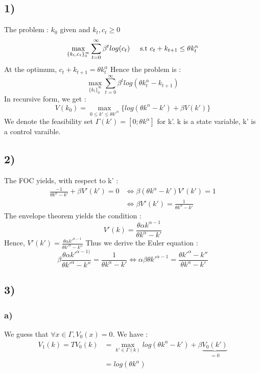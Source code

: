 \documentclass{article}
\begin{document}
\subsection{1)}
The problem : $k_0$ given and $k_t,c_t \geq 0$
$$\max_{\{k_t,c_t\}_0^\infty}\sum_{t=0}^\infty\beta^t log(c_t) \hspace{0.5cm}\text{s.t } c_t+k_{t+1}\leq \theta k_t^\alpha$$
At the optimum, $c_t + k_{t+1}=\theta k_t^\alpha$
Hence the problem is : 
$$\max_{\{k_t\}_0^\infty}\sum_{t=0}^\infty\beta^tlog(\theta k_t^\alpha - k_{t+1})$$
In recursive form, we get : $$V(k_0) = \max_{0\leq k' \leq \theta k'^\alpha }\{log(\theta k ^\alpha - k') + \beta V(k')\}$$
We denote the feasibility set $\Gamma(k') = [0; \theta k^\alpha]$ for k'. k is a state variable, k' is a control varaible. 

\subsection{2)}
The FOC yields, with respect to k' : $$\begin{aligned}\frac{-1}{\theta k^\alpha-k'} + \beta V'(k') = 0 &\Longleftrightarrow \beta (\theta k^\alpha-k')V'(k') = 1\\
&\Longleftrightarrow \beta V'(k') = \frac{1}{\theta k^\alpha-k'}\end{aligned}$$
The envelope theorem yields the condition : 
$$V'(k) = \frac{\theta \alpha k^{\alpha-1}}{\theta k^\alpha-k'}$$
Hence, $V'(k') = \frac{\theta \alpha k'^{\alpha-1}}{\theta k'^\alpha-k''}$
Thus we derive the Euler equation : 
$$\beta \frac{\theta\alpha k'^{\alpha-1)}}{\theta k'^\alpha-k''}=\frac{1}{\theta k^\alpha - k'}\Longleftrightarrow \alpha\beta\theta k'^{\alpha -1}= \frac{\theta k'^\alpha -k''}{\theta k^\alpha - k'}$$

\subsection{3)}
\subsubsection{a)}
We guess that $\forall x\in \Gamma, V_0(x) = 0$. We have :
$$\begin{aligned}V_1(k) = TV_0(k) &= \max _{k'\in \Gamma(k)} log(\theta k^\alpha-k')+\beta \underbrace{V_0(k')}_{=0}\\
&= log(\theta k^\alpha)\end{aligned}$$
\end{document}

